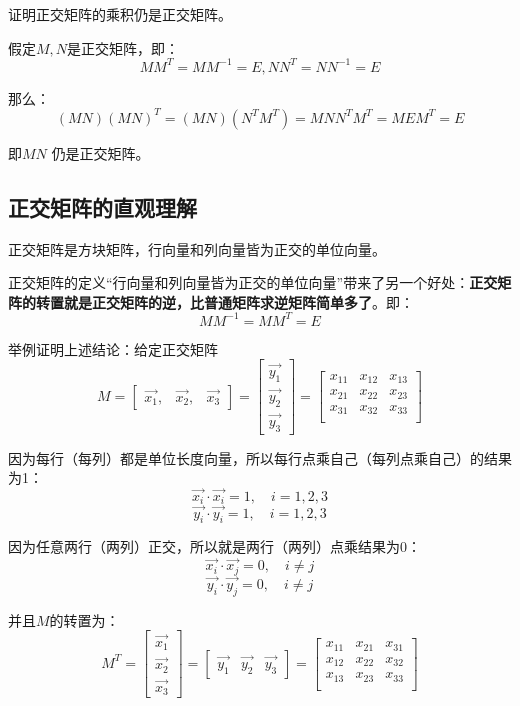 \documentclass[12pt]{article}
\begin{document}
\begin{framed}  
\small{
证明正交矩阵的乘积仍是正交矩阵。

假定$M,N$是正交矩阵，即：
$$
MM^T = MM^{-1} = E, NN^T = NN^{-1} = E
$$

那么：
$$
(MN)(MN)^T = (MN)(N^TM^T) = MNN^TM^T = MEM^T = E
$$

即$MN$ 仍是正交矩阵。
}
\end{framed}

\subsection{正交矩阵的直观理解}
正交矩阵是方块矩阵，行向量和列向量皆为正交的单位向量。

正交矩阵的定义“行向量和列向量皆为正交的单位向量”带来了另一个好处：\textbf{正交矩阵的转置就是正交矩阵的逆，比普通矩阵求逆矩阵简单多了}。即：
$$
MM^{-1} = MM^T = E
$$

举例证明上述结论：给定正交矩阵
$$
M = \begin{bmatrix}
\vec{x_1}, & \vec{x_2}, &\vec{x_3}
\end{bmatrix} = 
\begin{bmatrix}
\vec{y_1} \\ \vec{y_2} \\ \vec{y_3}
\end{bmatrix} = 
\begin{bmatrix}
x_{11} & x_{12} & x_{13} \\
x_{21} & x_{22} & x_{23} \\
x_{31} & x_{32} & x_{33} \\
\end{bmatrix}
$$

因为每行（每列）都是单位长度向量，所以每行点乘自己（每列点乘自己）的结果为1：
$$
\vec{x_i}\cdot\vec{x_i} = 1, \quad i = 1, 2, 3
$$
$$
\vec{y_i}\cdot\vec{y_i} = 1, \quad i = 1, 2, 3
$$

因为任意两行（两列）正交，所以就是两行（两列）点乘结果为0：
$$
\vec{x_i}\cdot\vec{x_j} = 0, \quad i \ne j
$$
$$
\vec{y_i}\cdot\vec{y_j} = 0, \quad i \ne j
$$

并且$M$的转置为：
$$
M^T = \begin{bmatrix}
\vec{x_1} \\ \vec{x_2} \\ \vec{x_3}
\end{bmatrix} = 
\begin{bmatrix}
\vec{y_1} & \vec{y_2} & \vec{y_3}
\end{bmatrix} = 
\begin{bmatrix}
x_{11} & x_{21} & x_{31} \\
x_{12} & x_{22} & x_{32} \\
x_{13} & x_{23} & x_{33} \\
\end{bmatrix}
$$
\end{document}

